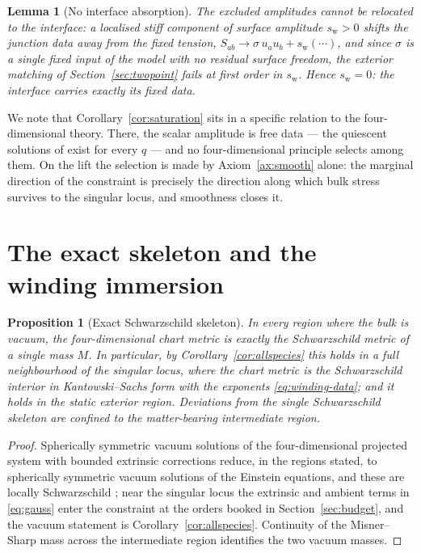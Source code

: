 \documentclass[11pt]{article}
\numberwithin{equation}{section}
\theoremstyle{plain}
\newtheorem{proposition}[theorem]{Proposition}
\newtheorem{lemma}[theorem]{Lemma}
\theoremstyle{definition}
\theoremstyle{remark}
\begin{document}
\begin{lemma}[No interface absorption]\label{lem:wall}
The excluded amplitudes cannot be relocated to the interface: a
localised stiff component of surface amplitude $s_{\mathrm{w}} > 0$
shifts the junction data away from the fixed tension,
$S_{ab} \to \sigma\, u_{a}u_{b} + s_{\mathrm{w}}(\cdots)$, and since
$\sigma$ is a single fixed input of the model with no residual surface
freedom, the exterior matching of Section~\ref{sec:twopoint} fails at
first order in $s_{\mathrm{w}}$. Hence $s_{\mathrm{w}} = 0$: the
interface carries exactly its fixed data.
\end{lemma}

We note that Corollary~\ref{cor:saturation} sits in a specific
relation to the four-dimensional theory. There, the scalar amplitude
is free data --- the quiescent solutions of
\cite{AnderssonRendall2001} exist for every $q$ --- and no
four-dimensional principle selects among them. On the lift the
selection is made by Axiom~\ref{ax:smooth} alone: the marginal
direction of the constraint is precisely the direction along which
bulk stress survives to the singular locus, and smoothness closes it.

\section{The exact skeleton and the winding immersion}
\label{sec:skeleton}

\begin{proposition}[Exact Schwarzschild skeleton]\label{prop:skeleton}
In every region where the bulk is vacuum, the four-dimensional chart
metric is exactly the Schwarzschild metric of a single mass $M$. In
particular, by Corollary~\ref{cor:allspecies} this holds in a full
neighbourhood of the singular locus, where the chart metric is the
Schwarzschild interior in Kantowski--Sachs form with the exponents
\eqref{eq:winding-data}; and it holds in the static exterior region.
Deviations from the single Schwarzschild skeleton are confined to the
matter-bearing intermediate region.
\end{proposition}

\begin{proof}
Spherically symmetric vacuum solutions of the four-dimensional
projected system with bounded extrinsic corrections reduce, in the
regions stated, to spherically symmetric vacuum solutions of the
Einstein equations, and these are locally Schwarzschild
\cite{Birkhoff1923}; near the singular locus the extrinsic and ambient
terms in \eqref{eq:gauss} enter the constraint at the orders booked in
Section~\ref{sec:budget}, and the vacuum statement is
Corollary~\ref{cor:allspecies}. Continuity of the Misner--Sharp mass
\cite{MisnerSharp1964} across the intermediate region identifies the
two vacuum masses.
\end{proof}
\end{document}
